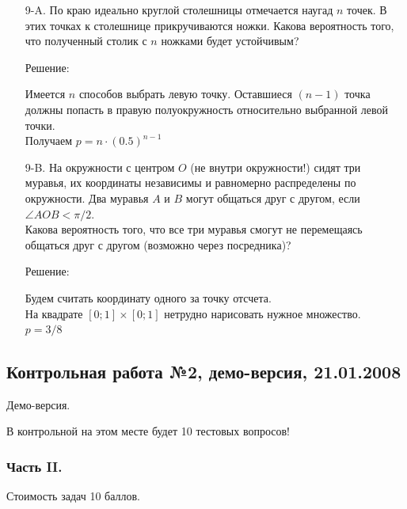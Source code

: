 \documentclass[12pt, a4paper]{article}\usepackage[]{graphicx}\usepackage[]{color}
\begin{document}
\begin{enumerate}
\item[9-A.] По краю идеально круглой столешницы отмечается наугад $n$ точек. В этих точках к столешнице прикручиваются ножки. Какова вероятность того, что полученный столик с $n$ ножками будет устойчивым?

Решение:

Имеется $n$ способов выбрать левую точку. Оставшиеся $(n-1)$ точка должны попасть в правую полуокружность относительно выбранной левой точки.\\
Получаем $p=n\cdot (0.5)^{n-1}$

\item[9-B.] На окружности  с центром $O$ (не внутри окружности!) сидят три муравья, их
координаты независимы и равномерно распределены по окружности. Два
муравья $A$ и $B$ могут общаться друг с другом, если $\angle AOB<\pi/2$. \\
Какова вероятность того, что все три муравья смогут не перемещаясь
общаться друг с другом (возможно через посредника)?

Решение:

Будем считать координату одного за точку отсчета. \\
На квадрате $[0;1]\times[0;1]$ нетрудно нарисовать нужное множество. \\
$p=3/8$
\end{enumerate}

\subsection{Контрольная работа №2, демо-версия, 21.01.2008}

Демо-версия.

В контрольной на этом месте будет 10 тестовых вопросов!

\subsubsection*{Часть II.}

Стоимость задач 10 баллов.
\end{document}
